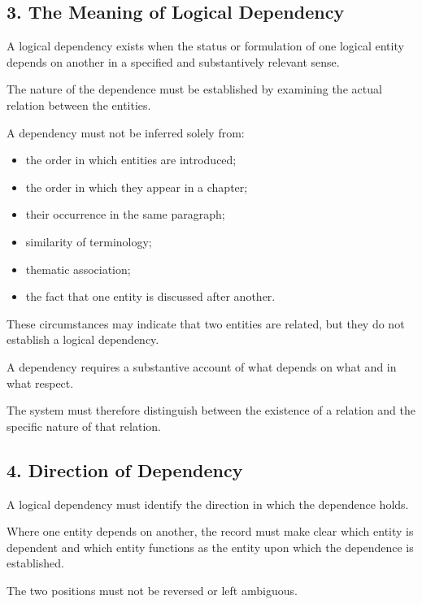 \subsection*{3. The Meaning of Logical Dependency}

A logical dependency exists when the status
or formulation of one logical entity depends
on another in a specified and substantively
relevant sense.

The nature of the dependence must be established
by examining the actual relation between the
entities.

A dependency must not be inferred solely from:

\begin{itemize}
    \item the order in which entities are introduced;
    \item the order in which they appear in a chapter;
    \item their occurrence in the same paragraph;
    \item similarity of terminology;
    \item thematic association;
    \item the fact that one entity is discussed
    after another.
\end{itemize}

These circumstances may indicate that two
entities are related, but they do not establish
a logical dependency.

A dependency requires a substantive account
of what depends on what and in what respect.

The system must therefore distinguish
between the existence of a relation and
the specific nature of that relation.


\subsection*{4. Direction of Dependency}

A logical dependency must identify the
direction in which the dependence holds.

Where one entity depends on another, the
record must make clear which entity is
dependent and which entity functions
as the entity upon which the dependence
is established.

The two positions must not be reversed
or left ambiguous.

